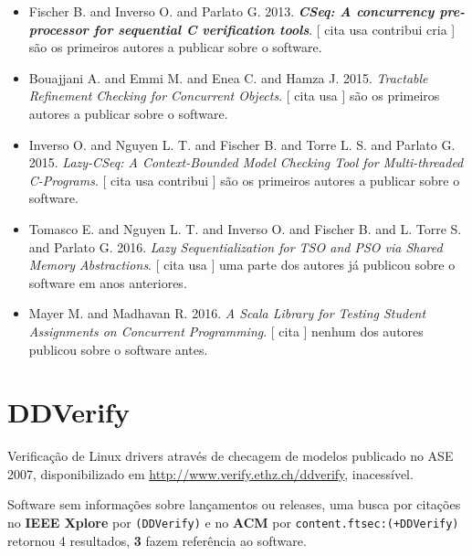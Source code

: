 \begin{itemize}
\item Fischer B. and Inverso O. and Parlato G.
      2013.
        \textbf{\textit{ CSeq: A concurrency pre-processor for sequential C verification tools}}.
      [
          cita
          usa
          contribui
          cria
      ]
são os primeiros autores a publicar sobre o software.
\item Bouajjani A. and Emmi M. and Enea C. and Hamza J.
      2015.
        \textit{ Tractable Refinement Checking for Concurrent Objects}.
      [
          cita
          usa
      ]
são os primeiros autores a publicar sobre o software.
\item Inverso O. and Nguyen L. T. and Fischer B. and Torre L. S. and Parlato G.
      2015.
        \textit{ Lazy-CSeq: A Context-Bounded Model Checking Tool for Multi-threaded C-Programs}.
      [
          cita
          usa
          contribui
      ]
são os primeiros autores a publicar sobre o software.
\item Tomasco E. and Nguyen L. T. and Inverso O. and Fischer B. and L. Torre S. and Parlato G.
      2016.
        \textit{ Lazy Sequentialization for TSO and PSO via Shared Memory Abstractions}.
      [
          cita
          usa
      ]
uma parte dos autores já publicou sobre o software em anos anteriores.
\item Mayer M. and Madhavan R.
      2016.
        \textit{ A Scala Library for Testing Student Assignments on Concurrent Programming}.
      [
          cita
      ]
nenhum dos autores publicou sobre o software antes.
\end{itemize}
\section{DDVerify}

Verificação de Linux drivers através de checagem de modelos
publicado no ASE 2007,
disponibilizado em \url{http://www.verify.ethz.ch/ddverify},
inacessível.

Software sem informações sobre lançamentos ou releases,
uma busca por citações no {\bf IEEE Xplore} por
\texttt{(DDVerify)}
e no {\bf ACM} por
\texttt{content.ftsec:(+DDVerify)}
retornou
4 resultados,
{\bf 3} fazem referência ao software.


